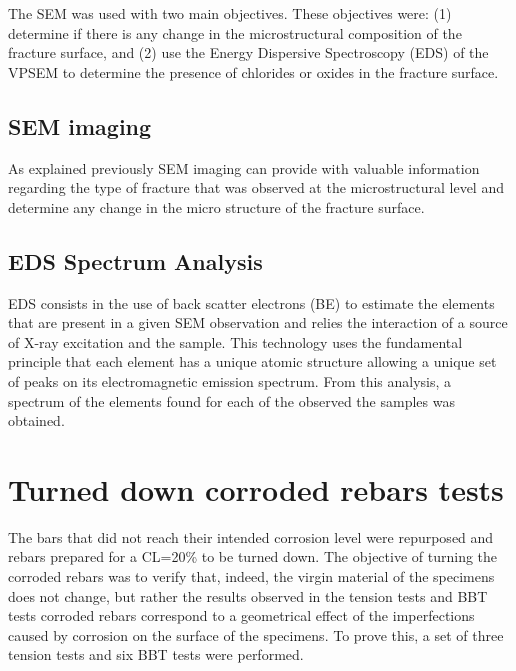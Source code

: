 The SEM was used with two main objectives. These objectives were: (1) determine if there is any change in the microstructural composition of the fracture surface, and (2) use the Energy Dispersive Spectroscopy (EDS) of the VPSEM to determine the presence of chlorides or oxides in the fracture surface. 

\subsection{SEM imaging}
As explained previously SEM imaging can provide with valuable information regarding the type of fracture that was observed at the microstructural level and determine any change in the micro structure of the fracture surface.

\subsection{EDS Spectrum Analysis}

EDS consists in the use of back scatter electrons (BE) to estimate the elements that are present in a given SEM observation and relies the interaction of a source of X-ray excitation and the sample. This technology uses the fundamental principle that each element has a unique atomic structure allowing a unique set of peaks on its electromagnetic emission spectrum. From this analysis, a spectrum of the elements found for each of the observed the samples was obtained. 

\section{Turned down corroded rebars tests}

The bars that did not reach their intended corrosion level were repurposed and rebars prepared for a CL=20\% to be turned down. The objective of turning the corroded rebars was to verify that, indeed, the virgin material of the specimens does not change, but rather the results observed in the tension tests and BBT tests corroded rebars correspond to a geometrical effect of the imperfections caused by corrosion on the surface of the specimens. To prove this, a set of three tension tests and six BBT tests were performed.

